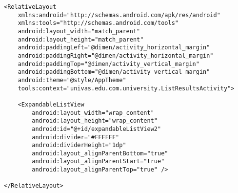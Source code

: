 \begin{lstlisting}[style=custom_XML]
<RelativeLayout 
	xmlns:android="http://schemas.android.com/apk/res/android"
    xmlns:tools="http://schemas.android.com/tools" 
    android:layout_width="match_parent"
    android:layout_height="match_parent" 
    android:paddingLeft="@dimen/activity_horizontal_margin"
    android:paddingRight="@dimen/activity_horizontal_margin"
    android:paddingTop="@dimen/activity_vertical_margin"
    android:paddingBottom="@dimen/activity_vertical_margin"
    android:theme="@style/AppTheme"
    tools:context="univas.edu.com.university.ListResultsActivity">

    <ExpandableListView
        android:layout_width="wrap_content"
        android:layout_height="wrap_content"
        android:id="@+id/expandableListView2"
        android:divider="#FFFFFF"
        android:dividerHeight="1dp"
        android:layout_alignParentBottom="true"
        android:layout_alignParentStart="true"
        android:layout_alignParentTop="true" />

</RelativeLayout>
\end{lstlisting}